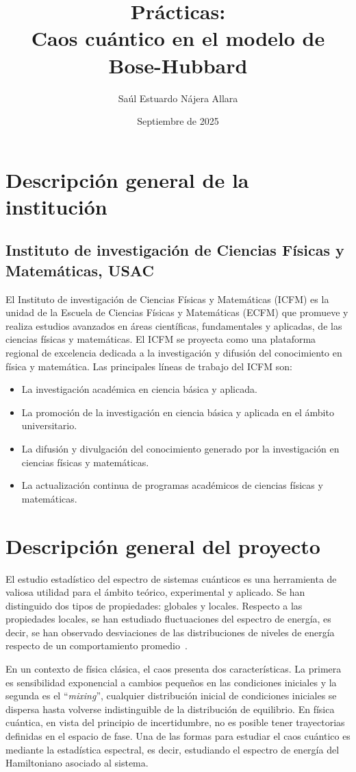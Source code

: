 \documentclass[spanish,titlepage,table]{practicas}
\institute{
    Universidad de San Carlos de Guatemala\\[.5em]
    Escuela de Ciencias Físicas y Matemáticas
}
\title{
    {\LARGE Prácticas:}\\[0.5em]
   Caos cuántico en el modelo de\\[0.4em]
	 Bose-Hubbard 
}
\author{Saúl Estuardo Nájera Allara}
\date{Septiembre de 2025}
\begin{document}
\maketitle

\section{Descripción general de la institución}\label{sec:institution}
\subsection{Instituto de investigación de Ciencias Físicas y Matemáticas, USAC} 
El Instituto de investigación de Ciencias Físicas y Matemáticas (ICFM) es la unidad de la Escuela de Ciencias Físicas y Matemáticas (ECFM) que promueve y realiza estudios avanzados en áreas científicas, fundamentales y aplicadas, de las ciencias físicas y matemáticas. El ICFM se proyecta como una plataforma regional de excelencia dedicada a la investigación y difusión del conocimiento en física y matemática. Las principales líneas de trabajo del ICFM son:
\begin{itemize}
    \item La investigación académica en ciencia básica y aplicada.
    \item La promoción de la investigación en ciencia básica y aplicada en el ámbito universitario.
    \item La difusión y divulgación del conocimiento generado por la investigación en ciencias físicas y matemáticas.
    \item La actualización continua de programas académicos de ciencias físicas y matemáticas.
\end{itemize}

\section{Descripción general del proyecto}\label{sec:description}
El estudio estadístico del espectro de sistemas cuánticos es una herramienta de valiosa utilidad para el ámbito teórico, experimental y aplicado.
Se han distinguido dos tipos de propiedades: globales y locales.
Respecto a las propiedades locales, se han estudiado fluctuaciones del espectro de energía, es decir, se han observado desviaciones de las distribuciones de niveles de energía respecto de un comportamiento promedio~\cite{Bohigas_1984}.


En un contexto de física clásica, el caos presenta dos características. 
La primera es sensibilidad exponencial a cambios pequeños en 
las condiciones iniciales y la segunda es el ``\textit{mixing}'', cualquier distribución inicial de condiciones iniciales se dispersa hasta volverse indistinguible de la distribución de equilibrio. 
En física cuántica, en vista del principio de incertidumbre, no es posible tener 
trayectorias definidas en el espacio de fase. Una de las formas para estudiar el caos cuántico es mediante la estadística espectral, es decir, estudiando el espectro de energía del Hamiltoniano asociado al sistema.
\end{document}

